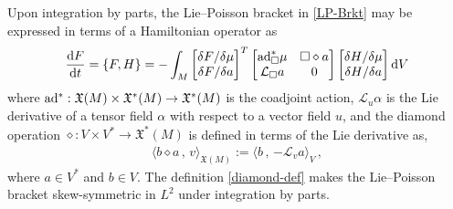 \documentclass[11pt, oneside]{article}   	%
\numberwithin{equation}{section}
\theoremstyle{plain}
\theoremstyle{definition}
\theoremstyle{remark}
\newcommand{\<}{\langle}
\renewcommand{\>}{\rangle}
\def\diff{\textnormal{d}}
\def\rmd{{\mathrm{d}}}
\newcommand{\Scp}[2]{{\Big\langle {#1}\, , \, {#2}\Big\rangle}}
\begin{document}
Upon integration by parts, the Lie--Poisson bracket in \eqref{LP-Brkt} may be expressed in terms of a Hamiltonian operator as  
\begin{align}
\frac{\diff F}{\diff t}=\{ F, H\}
=
-\int_M 
\begin{bmatrix}
{\delta F}/{\delta \mu} \\  {\delta F}/{ \delta a} 
\end{bmatrix}^T
\begin{bmatrix}
{\rm ad}^*_{\Box}\mu & \Box \diamond a
\\ 
\mathcal{L}_{\Box}a & 0
\end{bmatrix}
\begin{bmatrix}
{\delta H}/{\delta \mu} \\  {\delta H}/{ \delta a}  
\end{bmatrix}
{\rmd}V
\label{Ham-matrix-det}
\end{align}
where ${\rm ad^*} : \mathfrak X(M) \times \mathfrak X^*(M) \rightarrow \mathfrak X^*(M)$ is the coadjoint action, $\mathcal L_u \alpha$ is the Lie derivative of a tensor field $\alpha$ with respect to a vector field $u$, and the diamond operation $\diamond: V\times V^*\to \mathfrak{X}^*(M)$  is defined in terms of the Lie derivative as, 
    
\begin{align}
\Scp{b\diamond a}{v}_{\mathfrak{X}(M)} := \Scp{b }{- \mathcal{L}_v a}_V 
\,,\label{diamond-def}
\end{align}
where $a\in V^*$ and $b\in V$. 
The definition \eqref{diamond-def} makes the Lie--Poisson bracket skew-symmetric in $L^2$ under integration by parts.
 
\end{document}

